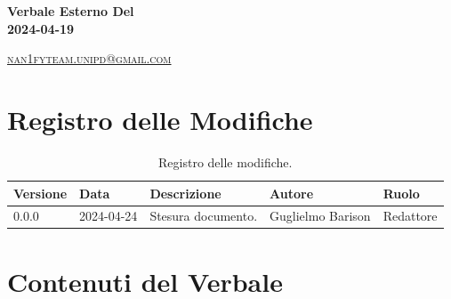 \documentclass[8pt]{article}
\begin{document}
\begin{titlepage}
\begin{minipage}[t]{0.47\textwidth}
{		}
		\vspace{4mm}\vspace{4mm}
	\end{minipage}
	\vspace{4cm}
	\begin{center}
		\begin{flushright}
			{\fontsize{30pt}{52pt}\selectfont \textbf{Verbale Esterno Del\\2024-04-19\\}} %
		\end{flushright}
		\vspace{3cm}
	\end{center}
	\vspace{8.5 cm}
	{\small \textsc{\href{mailto: nan1fyteam.unipd@gmail.com}{nan1fyteam.unipd@gmail.com}}}
\end{titlepage}
\pagestyle{mystyle}
\section*{Registro delle Modifiche}
\begin{table}[ht!]	
	\centering
	\begin{tabular}{p{1.2cm} p{2cm} p{6cm} p{3cm} p{2cm}}
		\toprule
		\textbf{Versione}& \textbf{Data} & \textbf{Descrizione} & \textbf{Autore} & \textbf{Ruolo} \\
		\midrule
		0.0.0 & 2024-04-24 & Stesura documento.  & Guglielmo Barison & Redattore \\
		\bottomrule
	\end{tabular}
	\caption{Registro delle modifiche.}
	\label{table:Registro delle modifiche}
\end{table}
\newpage
\tableofcontents
\clearpage
\newpage
\justifying
\section{Contenuti del Verbale}
\end{document}
